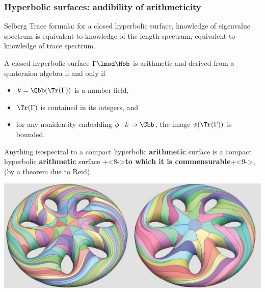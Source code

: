 \documentclass[10pt]{beamer}
\begin{document}
\begin{frame} \frametitle{Hyperbolic surfaces: audibility of arithmeticity}
Selberg Trace formula:  for a closed hyperbolic surface, knowledge of eigenvalue spectrum is equivalent to knowledge of the length spectrum, \pause equivalent to knowledge of trace spectrum. \pause  
\begin{thm}[Takeuchi]
	A closed hyperbolic surface $\Gamma \lmod \Hbb$ is arithmetic and derived from a quaternion algebra if and only if  
	\begin{itemize} [<+->]
		\item $k=\Qbb(\Tr(\Gamma))$  is a number field, 
		\item $\Tr(\Gamma)$ is contained in its integers, and 
		\item for any nonidentity embedding $\phi: k \to \Cbb$, the image $\phi(\Tr(\Gamma))$ is bounded.   
	\end{itemize}
\end{thm}
\pause
Anything isospectral to a compact hyperbolic \textbf{arithmetic} surface is a compact 
hyperbolic \textbf{arithmetic} surface \onslide+<8->{\textbf{to which it is 
commensurable}}\onslide+<9->,{ (by a 
theorem due to Reid).} 
\end{frame}%



\begin{frame}%
	\centering
	 \includegraphics[scale=.5]{vanWijkGenus7.jpg}
\end{frame}%
\end{document}
